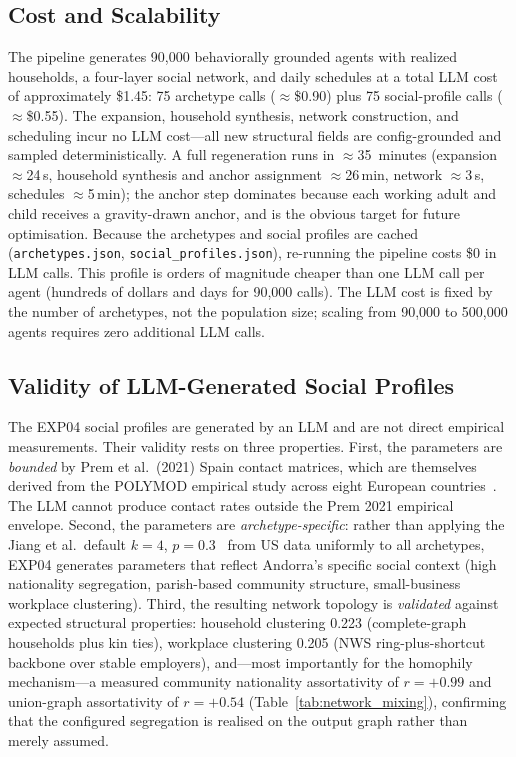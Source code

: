 \documentclass[a4paper,12pt]{article}
\begin{document}
\subsection{Cost and Scalability}
\label{subsec:scalability}

The pipeline generates 90,000 behaviorally grounded agents with realized
households, a four-layer social network, and daily schedules at a total LLM cost
of approximately \$1.45: 75 archetype calls ($\approx$\$0.90) plus 75 social-profile
calls ($\approx$\$0.55). The expansion, household synthesis, network construction,
and scheduling incur no LLM cost---all new structural fields are config-grounded and
sampled deterministically. A full regeneration runs in $\approx$35~minutes
(expansion $\approx$24\,s, household synthesis and anchor assignment $\approx$26\,min,
network $\approx$3\,s, schedules $\approx$5\,min); the anchor step dominates because
each working adult and child receives a gravity-drawn anchor, and is the obvious
target for future optimisation. Because the archetypes and social profiles are cached
(\texttt{archetypes.json}, \texttt{social\_profiles.json}), re-running the pipeline
costs \$0 in LLM calls. This profile is orders of magnitude cheaper than one LLM call
per agent (hundreds of dollars and days for 90,000 calls). The LLM cost is fixed by
the number of archetypes, not the population size; scaling from 90,000 to 500,000
agents requires zero additional LLM calls.

\subsection{Validity of LLM-Generated Social Profiles}
\label{subsec:social_validity}

The EXP04 social profiles are generated by an LLM and are not direct
empirical measurements. Their validity rests on three properties. First,
the parameters are \emph{bounded} by Prem et al.\ (2021) Spain contact
matrices, which are themselves derived from the POLYMOD empirical study
across eight European countries~\cite{mossong2008social}. The LLM cannot
produce contact rates outside the Prem 2021 empirical envelope. Second,
the parameters are \emph{archetype-specific}: rather than applying the
Jiang et al.\ default $k = 4$, $p = 0.3$~\cite{jiang2024large} from US data
uniformly to all archetypes, EXP04 generates parameters that reflect
Andorra's specific social context (high nationality segregation,
parish-based community structure, small-business workplace clustering).
Third, the resulting network topology is \emph{validated} against expected
structural properties: household clustering 0.223 (complete-graph households
plus kin ties), workplace clustering 0.205 (NWS ring-plus-shortcut backbone over
stable employers), and---most importantly for the homophily mechanism---a measured
community nationality assortativity of $r=+0.99$ and union-graph assortativity of
$r=+0.54$ (Table~\ref{tab:network_mixing}), confirming that the configured
segregation is realised on the output graph rather than merely assumed.
\end{document}
